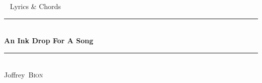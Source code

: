 \documentclass[a4paper,11pt,french]{article}
\newcommand*{\HRule}{\rule{\linewidth}{0.4mm}}  %
\newcommand*{\auteur}[2]{\large #1~\textsc{#2}} %
\newcommand{\pretitre}{Lyrics \& Chords}
\newcommand{\grostitre}{An Ink Drop For A Song}
\newcommand{\auteurs}{\auteur{Joffrey}{Bion}}
\newcommand{\madate}{\the\year} %
\begin{document}

\begin{titlepage}
  \begin{center}
    ~
    \vfill
    {\LARGE\pretitre\\}           %
    \vspace{2cm}
    \HRule \\[0.4cm]
    {\Huge\bf\grostitre\\[0.4cm]} %
    \HRule \\[0.4cm]
    \vspace{2cm}
    \auteurs\\                    %
    \vfill
    \vfill
    {\large\madate}               %
  \end{center}
\end{titlepage}





\end{document}
